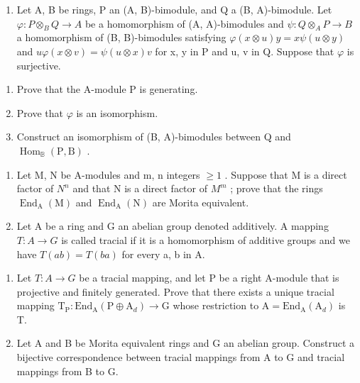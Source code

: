 
\begin{enumerate}
\def\labelenumi{\arabic{enumi})}
\tightlist
\item
  Let A, B be rings, P an (A, B)-bimodule, and Q a (B, A)-bimodule. Let \(\varphi: P \otimes_{B} Q \to A\) be a homomorphism of (A, A)-bimodules and \(\psi: Q \otimes_{A} P \to B\) a homomorphism of (B, B)-bimodules satisfying \(\varphi(x \otimes u)y = x\psi(u \otimes y)\) and \(u\varphi(x \otimes v) = \psi(u \otimes x)v\) for x, y in P and u, v in Q. Suppose that \(\varphi\) is surjective.
\end{enumerate}

\begin{enumerate}
\def\labelenumi{\alph{enumi})}
\item
  Prove that the A-module P is generating.
\item
  Prove that \(\varphi\) is an isomorphism.
\item
  Construct an isomorphism of (B, A)-bimodules between Q and \(\operatorname{Hom}_{\mathbb{B}}(\mathrm{P}, \mathrm{B})\) .
\end{enumerate}

\begin{enumerate}
\def\labelenumi{\arabic{enumi})}
\setcounter{enumi}{1}
\item
  Let M, N be A-modules and m, n integers \(\geqslant 1\) . Suppose that M is a direct factor of \(N^{n}\) and that N is a direct factor of \(M^{m}\) ; prove that the rings \(\operatorname{End}_{\mathrm{A}}(\mathrm{M})\) and \(\operatorname{End}_{\mathrm{A}}(\mathrm{N})\) are Morita equivalent.
\item
  Let A be a ring and G an abelian group denoted additively. A mapping \(T: A \to G\) is called tracial if it is a homomorphism of additive groups and we have \(T(ab) = T(ba)\) for every a, b in A.
\end{enumerate}

\begin{enumerate}
\def\labelenumi{\alph{enumi})}
\item
  Let \(T : A \to G\) be a tracial mapping, and let P be a right A-module that is projective and finitely generated. Prove that there exists a unique tracial mapping \(\mathrm{T}_{\mathrm{P}} : \mathrm{End}_{\mathrm{A}}(\mathrm{P} \oplus \mathrm{A}_{d}) \to \mathrm{G}\) whose restriction to \(\mathrm{A} = \mathrm{End}_{\mathrm{A}}(\mathrm{A}_{d})\) is T.
\item
  Let A and B be Morita equivalent rings and G an abelian group. Construct a bijective correspondence between tracial mappings from A to G and tracial mappings from B to G.
\end{enumerate}

